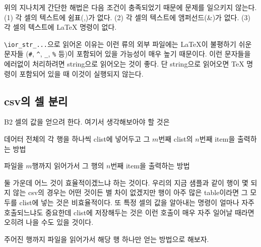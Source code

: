 위의 지나치게 간단한 해법은 다음 조건이 충족되었기 때문에 문제를 일으키지 않는다.
(1) 각 셀의 텍스트에 쉼표(,)가 없다.
(2) 각 셀의 텍스트에 앰퍼선드(\&)가 없다.
(3) 각 셀의 텍스트에 \LaTeX{} 명령이 없다.

\verb|\ior_str_...|으로 읽어온 이유는 이런 류의 외부 파일에는 \LaTeX 이 불평하기 쉬운
문자들 (\verb|#|, \verb|^|, \verb|_|, \verb|%| 등)이 포함되어 있을 가능성이 매우 높기 
때문이다. 이런 문자들을 에러없이 처리하려면 string으로 읽어오는 것이 좋다. 단 string으로
읽어오면 \TeX{} 명령이 포함되어 있을 때 이것이 실행되지 않는다.

\subsection{csv의 셀 분리}

B2 셀의 값을 얻으려 한다. 여기서 생각해보아야 할 것은 

 데어터 전체의 각 행을 하나씩 clist에 넣어두고 그 $m$번째 clist의 $n$번째 item을 출력하는 방법

 파일을 $m$행까지 읽어가서 그 행의 $n$번째 item을 출력하는 방법

둘 가운데 어느 것이 효율적이겠느냐 하는 것이다. 우리의 지금 샘플과 같이 행이 몇 되지 않는
csv의 경우는 어떤 것이든 별 차이 없겠지만 행이 아주 많은 table이라면 그 모두를 clist에 넣는 것은
비효율적이다. 또 특정 셀의 값을 알아내는 명령이 얼마나 자주 호출되느냐도 중요한데 clist에 저장해두는
것은 이런 호출이 매우 자주 일어날 때라면 오히려 나을 수도 있을 것이다.

주어진 행까지 파일을 읽어가서 해당 행 하나만 얻는 방법으로 해보자.


